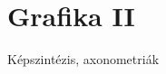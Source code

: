 \documentclass[../../main.tex]{subfiles}
\begin{document}
\section{Grafika II}

\begin{fulltheorem}
	Képszintézis, axonometriák
\end{fulltheorem}
\end{document}
